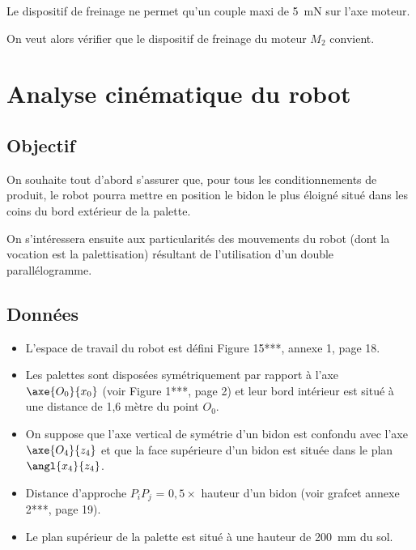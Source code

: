 Le dispositif de freinage ne permet qu’un couple maxi de \SI{5}{mN} sur l’axe 
moteur. 




On veut alors vérifier que le dispositif de freinage du moteur $M_2$ convient. 




\section{Analyse cinématique du robot}

\subsection{Objectif}

On souhaite tout d’abord s’assurer que, pour tous les conditionnements de produit, le robot 
pourra mettre en position le bidon le plus éloigné situé dans les coins du bord extérieur de la 
palette. 

On s’intéressera ensuite aux particularités des mouvements du robot (dont la vocation est la 
palettisation) résultant de l’utilisation d’un double parallélogramme. 

\subsection{Données} 
\begin{itemize}
\item L’espace de travail du robot est défini Figure 15***, annexe 1, page 18. 
\item Les palettes sont disposées symétriquement par rapport à l’axe $\axe{O_0}{x_0}$ (voir Figure 1***, 
page 2) et leur bord intérieur est situé à une distance de 1,6 mètre du point $O_0$. 
\item On suppose que l’axe vertical de symétrie d’un bidon est confondu avec l’axe $\axe{O_4}{z_4}$
et que la face supérieure d’un bidon est située dans le plan $\angl{x_4}{z_4}$. 
\item Distance d’approche $P_iP_j$ = $0,5 \times$ hauteur d’un bidon (voir grafcet annexe 2***, page 19). 
\item Le plan supérieur de la palette est situé à une hauteur de \SI{200}{mm} du sol. 
\end{itemize}


